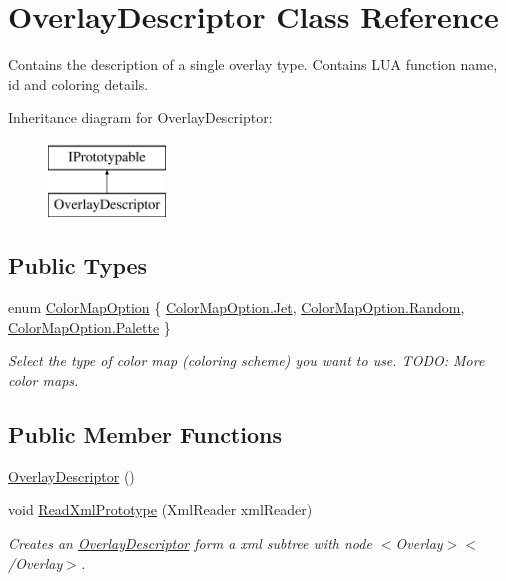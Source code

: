 \hypertarget{class_overlay_descriptor}{}\section{Overlay\+Descriptor Class Reference}
\label{class_overlay_descriptor}


Contains the description of a single overlay type. Contains L\+UA function name, id and coloring details.  


Inheritance diagram for Overlay\+Descriptor\+:\begin{figure}[H]
\begin{center}
\leavevmode
\includegraphics[height=2.000000cm]{class_overlay_descriptor}
\end{center}
\end{figure}
\subsection*{Public Types}
\begin{DoxyCompactItemize}
\item 
enum \hyperlink{class_overlay_descriptor_ace98995d8c49c9395934100f3e5e1240}{Color\+Map\+Option} \{ \hyperlink{class_overlay_descriptor_ace98995d8c49c9395934100f3e5e1240a252ce7e80c1ffd8c2558ad9b13d4ca2b}{Color\+Map\+Option.\+Jet}, 
\hyperlink{class_overlay_descriptor_ace98995d8c49c9395934100f3e5e1240a64663f4646781c9c0110838b905daa23}{Color\+Map\+Option.\+Random}, 
\hyperlink{class_overlay_descriptor_ace98995d8c49c9395934100f3e5e1240a278f9a3d3077c522e71022e302b9e0e4}{Color\+Map\+Option.\+Palette}
 \}\begin{DoxyCompactList}\small\item\em Select the type of color map (coloring scheme) you want to use. T\+O\+DO\+: More color maps. \end{DoxyCompactList}
\end{DoxyCompactItemize}
\subsection*{Public Member Functions}
\begin{DoxyCompactItemize}
\item 
\hyperlink{class_overlay_descriptor_a518174908981876ab479afd8c47544c2}{Overlay\+Descriptor} ()
\item 
void \hyperlink{class_overlay_descriptor_ad20c8b4b4817e2bea919a3619401ef38}{Read\+Xml\+Prototype} (Xml\+Reader xml\+Reader)
\begin{DoxyCompactList}\small\item\em Creates an \hyperlink{class_overlay_descriptor}{Overlay\+Descriptor} form a xml subtree with node $<$Overlay$>$$<$/\+Overlay$>$. \end{DoxyCompactList}\end{DoxyCompactItemize}
